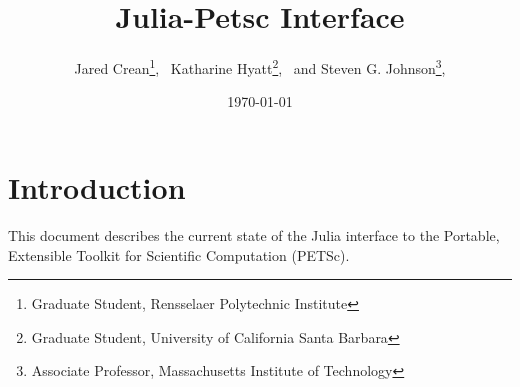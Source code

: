 \documentclass{article}
\title{Julia-Petsc Interface}
\author{
  Jared Crean\thanks{Graduate Student, Rensselaer Polytechnic Institute}, \
  Katharine Hyatt\thanks{Graduate Student, University of California Santa Barbara}, \ and
  Steven G. Johnson\thanks{Associate Professor, Massachusetts Institute of Technology},
}
\date{\today}
\begin{document}
\maketitle

\section{Introduction} \label{sec:intro}
This document describes the current state of the Julia interface to the Portable, Extensible Toolkit for Scientific Computation (PETSc).
\end{document}
